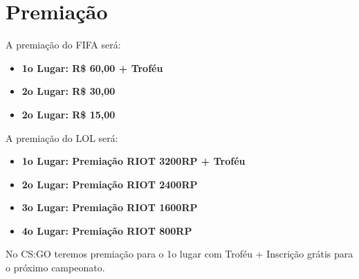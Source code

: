 \section{Premiação}

A premiação do FIFA será:
\begin{itemize}
	\item \textbf{1o Lugar: R\$ 60,00 + Troféu}
    \item \textbf{2o Lugar: R\$ 30,00}
    \item \textbf{2o Lugar: R\$ 15,00}
\end{itemize}

A premiação do LOL será:
\begin{itemize}
	\item \textbf{1o Lugar: Premiação RIOT 3200RP + Troféu}
    \item \textbf{2o Lugar: Premiação RIOT 2400RP}
    \item \textbf{3o Lugar: Premiação RIOT 1600RP}
    \item \textbf{4o Lugar: Premiação RIOT 800RP}
\end{itemize}

No CS:GO teremos premiação para o 1o lugar com Troféu + Inscrição grátis para o próximo campeonato.

